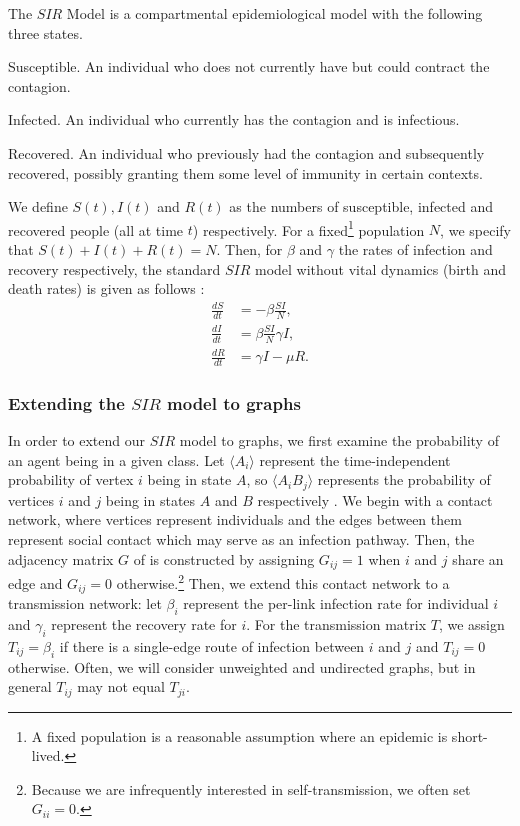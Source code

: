 \documentclass[../report.tex]{subfiles}
\begin{document}
The $SIR$ Model is a compartmental epidemiological model with the following three states.
\begin{definition}{Susceptible.}
An individual who does not currently have but could contract the contagion.
\end{definition}
\begin{definition}{Infected.}
An individual who currently has the contagion and is infectious.
\end{definition}
\begin{definition}{Recovered.}
An individual who previously had the contagion and subsequently recovered, possibly granting them some level of immunity in certain contexts.
\end{definition}
We define $S(t), I(t)$ and $R(t)$ as the numbers of susceptible, infected and recovered people (all at time $t$) respectively. For a fixed\footnote{A fixed population is a reasonable assumption where an epidemic is short-lived.} population $N$, we specify that $S(t) + I(t) + R(t) = N$. Then, for $\beta$ and $\gamma$ the rates of infection and recovery respectively, the standard $SIR$ model without vital dynamics (birth and death rates) is given as follows \cite{hethcote_00}:
\begin{align*}
\frac{dS}{dt} & = -\beta \frac{SI}{N},\\
\frac{dI}{dt} & = \beta\frac{SI}{N} \gamma I,\\
\frac{dR}{dt} & = \gamma I - \mu R.
\end{align*}

\subsubsection{Extending the $SIR$ model to graphs}

In order to extend our $SIR$ model to graphs, we first examine the probability of an agent being in a given class. Let $\langle A_i \rangle$ represent the time-independent probability of vertex $i$ being in state $A$, so $\langle A_i B_j \rangle$ represents the probability of vertices $i$ and $j$ being in states $A$ and $B$ respectively \cite{kiss_2014}. We begin with a contact network, where vertices represent individuals and the edges between them represent social contact which may serve as an infection pathway. Then, the adjacency matrix $G$ of is constructed by assigning $G_{ij} = 1$ when $i$ and $j$ share an edge and $G_{ij} = 0$ otherwise.\footnote{Because we are infrequently interested in self-transmission, we often set $G_{ii}=0$.} Then, we extend this contact network to a transmission network: let $\beta_i$ represent the per-link infection rate for individual $i$ and $\gamma_i$ represent the recovery rate for $i$. For the transmission matrix $T$, we assign $T_{ij}=\beta_i$ if there is a single-edge route of infection between $i$ and $j$ and $T_{ij}=0$ otherwise. Often, we will consider unweighted and undirected graphs, but in general $T_{ij}$ may not equal $T_{ji}$.
\end{document}
